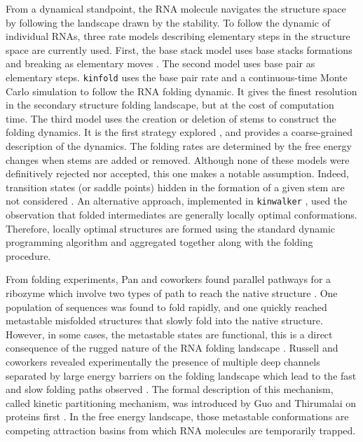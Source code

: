 \documentclass[a4paper,12pt]{article}
\begin{document}
From a dynamical standpoint, the RNA molecule navigates the structure space by
following the landscape drawn by the stability. To follow the dynamic of
individual RNAs, three rate models describing elementary steps in the structure
space are currently used. First, the base stack model uses base stacks
formations and breaking as elementary moves \cite{zhang02_rna_hairp_foldin_kinet}.
The second model uses base pair as elementary steps. \texttt{kinfold}
\cite{flamm00_rna_foldin_at_elemen_step_resol} uses the base pair rate and a
continuous-time Monte Carlo simulation to follow the RNA folding dynamic. It
gives the finest resolution in the secondary structure folding landscape, but at
the cost of computation time. The third model uses the creation or deletion of
stems to construct the folding dynamics. It is the first strategy explored
\cite{martinez84_rna_foldin_rule}, and provides a coarse-grained description of
the dynamics. The folding rates are determined by the free energy changes when
stems are added or removed. Although none of these models were definitively
rejected nor accepted, this one makes a notable assumption. Indeed, transition
states (or saddle points) hidden in the formation of a given stem are not
considered \cite{zhang06_explor_compl_foldin_kinet_rna_hairp}. An alternative
approach, implemented in \texttt{kinwalker} \cite{geis2008folding}, used the observation
that folded intermediates are generally locally optimal conformations.
Therefore, locally optimal structures are formed using the standard dynamic
programming algorithm and aggregated together along with the folding procedure.

From folding experiments, Pan and coworkers found parallel pathways for a
ribozyme which involve two types of path to reach the native structure
\cite{pan97_foldin_rna_invol_paral_pathw}. One population of sequences was found
to fold rapidly, and one quickly reached metastable misfolded structures that
slowly fold into the native structure. However, in some cases, the metastable
states are functional, this is a direct consequence of the rugged nature of the
RNA folding landscape \cite{solomatin10_multip_nativ_states_reveal_persis}.
Russell and coworkers revealed experimentally the presence of multiple deep
channels separated by large energy barriers on the folding landscape which lead
to the fast and slow folding paths observed
\cite{russell01_explor_foldin_lands_struc_rna}. The formal description of this
mechanism, called kinetic partitioning mechanism, was introduced by Guo and
Thirumalai on proteins first \cite{guo95_kinet_protein_foldin}. In the free energy
landscape, those metastable conformations are competing attraction basins from
which RNA molecules are temporarily trapped.
\end{document}
